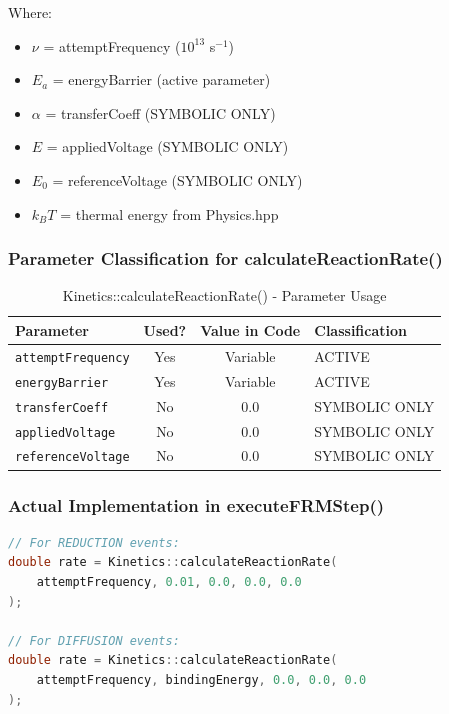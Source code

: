 \documentclass[11pt,a4paper]{article}
\begin{document}
Where:
\begin{itemize}
    \item $\nu$ = attemptFrequency ($10^{13}$ s$^{-1}$)
    \item $E_a$ = energyBarrier (active parameter)
    \item $\alpha$ = transferCoeff (SYMBOLIC ONLY)
    \item $E$ = appliedVoltage (SYMBOLIC ONLY)
    \item $E_0$ = referenceVoltage (SYMBOLIC ONLY)
    \item $k_B T$ = thermal energy from Physics.hpp
\end{itemize}

\subsubsection{Parameter Classification for calculateReactionRate()}

\begin{table}[H]
\centering
\caption{Kinetics::calculateReactionRate() - Parameter Usage}
\begin{tabular}{|l|c|c|l|}
\hline
\textbf{Parameter} & \textbf{Used?} & \textbf{Value in Code} & \textbf{Classification} \\
\hline
\texttt{attemptFrequency} & Yes & Variable & ACTIVE \\
\texttt{energyBarrier} & Yes & Variable & ACTIVE \\
\texttt{transferCoeff} & No & 0.0 & SYMBOLIC ONLY \\
\texttt{appliedVoltage} & No & 0.0 & SYMBOLIC ONLY \\
\texttt{referenceVoltage} & No & 0.0 & SYMBOLIC ONLY \\
\hline
\end{tabular}
\end{table}

\subsubsection{Actual Implementation in executeFRMStep()}

\begin{lstlisting}[language=C++, breaklines=true]
// For REDUCTION events:
double rate = Kinetics::calculateReactionRate(
    attemptFrequency, 0.01, 0.0, 0.0, 0.0
);

// For DIFFUSION events:
double rate = Kinetics::calculateReactionRate(
    attemptFrequency, bindingEnergy, 0.0, 0.0, 0.0
);
\end{lstlisting}
\end{document}

